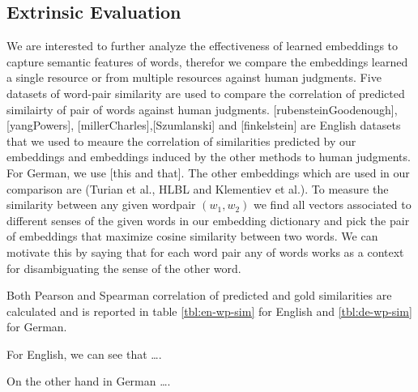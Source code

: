 \documentclass[11pt]{article}
\begin{document}
\subsection{Extrinsic Evaluation}
\label{ssec:extrinsic}
 \label{exp:word-similarity}
 We are interested to further analyze the effectiveness of learned embeddings to capture semantic features of words, therefor 
 we compare the embeddings learned a single resource or from multiple resources against human judgments.
 Five datasets of word-pair similarity are used to compare the correlation of predicted similairty of 
 pair of words against human judgments.
 [rubensteinGoodenough], [yangPowers], [millerCharles],[Szumlanski] and [finkelstein] are English datasets that we used 
 to meaure the correlation of similarities
 predicted by our embeddings and  embeddings induced by the other methods to human judgments. 
 For German, we use [this and that].
 The other embeddings which are used in our comparison are (Turian et al., HLBL and Klementiev et al.).
 To measure the similarity between any given wordpair $(w_1 , w_2)$ we find all vectors associated to different senses
 of the given words in our embedding dictionary and pick the pair of embeddings that maximize cosine similarity between two words. 
 We can motivate this by saying that for each word pair any of words works as a context for disambiguating the sense of the other word.
  
 Both Pearson and Spearman correlation of predicted and gold similarities 
 are calculated and is reported in table \ref{tbl:en-wp-sim} for English and \ref{tbl:de-wp-sim} for German.
 
 For English, we can see that \ldots.
 
 On the other hand in German \ldots. 
 
\end{document}
